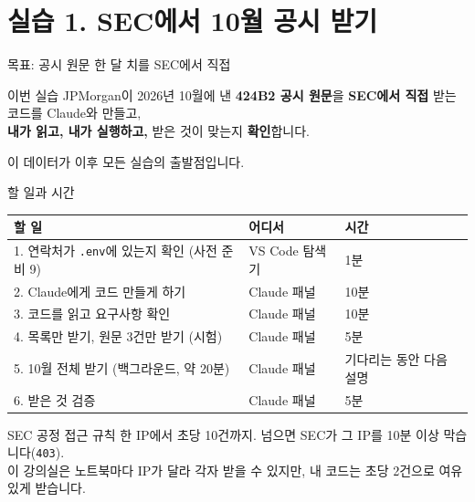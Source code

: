 \section{실습 1. SEC에서 10월 공시 받기}

\begin{frame}{목표: 공시 원문 한 달 치를 SEC에서 직접}
\begin{block}{이번 실습}
JPMorgan이 \num{2026년 10월}에 낸 \textbf{424B2 공시 원문}을 \textbf{SEC에서 직접} 받는 코드를 Claude와 만들고,\\
\textbf{내가 읽고, 내가 실행하고,} 받은 것이 맞는지 \textbf{확인}합니다.
\end{block}
\vspace{0.6em}
\centering\small 이 데이터가 이후 모든 실습의 출발점입니다.\\[6pt]
\end{frame}

\begin{frame}{할 일과 시간}
\small
\renewcommand{\arraystretch}{1.1}
\begin{tabularx}{\textwidth}{@{}X l l@{}}
\toprule
\textbf{할 일} & \textbf{어디서} & \textbf{시간} \\
\midrule
1. 연락처가 \texttt{.env}에 있는지 확인 (사전 준비 9) & VS Code 탐색기 & 1분 \\
2. Claude에게 코드 만들게 하기 & Claude 패널 & 10분 \\
3. 코드를 읽고 요구사항 확인 & Claude 패널 & 10분 \\
4. 목록만 받기, 원문 3건만 받기 (시험) & Claude 패널 & 5분 \\
5. 10월 전체 받기 (백그라운드, 약 20분) & Claude 패널 & 기다리는 동안 다음 설명 \\
6. 받은 것 검증 & Claude 패널 & 5분 \\
\bottomrule
\end{tabularx}
\vspace{0.5em}
\begin{alertblock}{SEC 공정 접근 규칙}
한 IP에서 \num{초당 10건}까지. 넘으면 SEC가 그 IP를 10분 이상 막습니다(\texttt{403}).\\
이 강의실은 노트북마다 IP가 달라 각자 받을 수 있지만, 내 코드는 \num{초당 2건}으로 여유 있게 받습니다.
\end{alertblock}
\end{frame}


